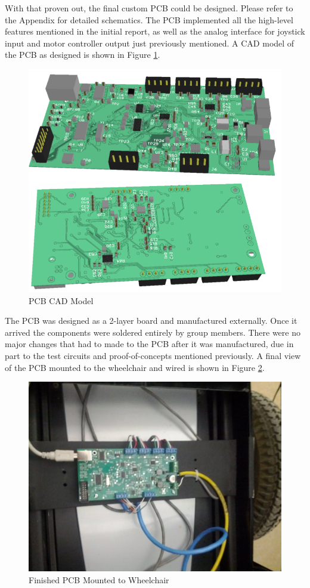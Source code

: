 \documentclass[oneside,final,a4paper]{report}
\begin{document}
With that proven out, the final custom PCB could be designed. Please refer to the Appendix for detailed schematics. The PCB implemented all the high-level features mentioned in the initial report, as well as the analog interface for joystick input and motor controller output just previously mentioned. A CAD model of the PCB as designed is shown in Figure \ref{fig:PCB}.
\begin{figure}[hbt]
 \centering
 \includegraphics[scale=0.5]{PCB_Custom}
 \caption{PCB CAD Model}\label{fig:PCB}
\end{figure}

The PCB was designed as a 2-layer board and manufactured externally. Once it arrived the components were soldered entirely by group members. There were no major changes that had to made to the PCB after it was manufactured, due in part to the test circuits and proof-of-concepts mentioned previously. A final view of the PCB mounted to the wheelchair and wired is shown in Figure \ref{fig:PCB_wired}.
\begin{figure}[hbt]
 \centering
 \includegraphics[scale=0.5]{chair_wired}
 \caption{Finished PCB Mounted to Wheelchair}\label{fig:PCB_wired}
\end{figure}
\end{document}
